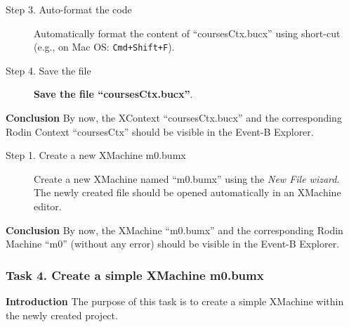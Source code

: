 \begin{description}
\item[Step 3. Auto-format the code] Automatically format the content of ``coursesCtx.bucx'' using short-cut (e.g., on Mac OS: \texttt{Cmd+Shift+F}).

\item[Step 4. Save the file] \textbf{Save the file ``coursesCtx.bucx''}.
\end{description}
\textbf{Conclusion} By now, the XContext ``coursesCtx.bucx'' and the corresponding Rodin Context ``coursesCtx'' should be visible in the Event-B Explorer.
\begin{description}
\item[Step 1. Create a new XMachine m0.bumx] Create a new XMachine named ``m0.bumx'' using the \emph{New File wizard}. The newly created file should be opened automatically in an XMachine editor.
\end{description}

\textbf{Conclusion} By now, the XMachine ``m0.bumx'' and the corresponding Rodin Machine ``m0'' (without any error) should be visible in the Event-B Explorer.

\subsubsection{Task 4. Create a simple XMachine m0.bumx}
\textbf{Introduction} The purpose of this task is to create a simple XMachine within the newly created project.

